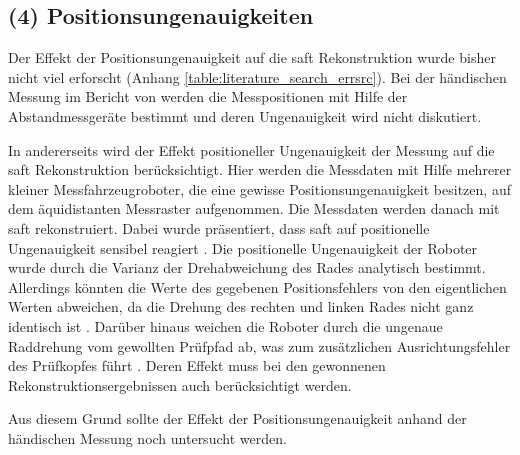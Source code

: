 \subsection*{(4) Positionsungenauigkeiten} 
Der Effekt der Positionsungenauigkeit auf die \acrshort{saft} Rekonstruktion wurde bisher nicht viel erforscht (Anhang \ref{table:literature_search_errsrc}). Bei der händischen Messung im Bericht von \cite{Mayer16SAFTwithSmallData} werden die Messpositionen mit Hilfe der Abstandmessgeräte bestimmt und deren Ungenauigkeit wird nicht diskutiert. \par
In \cite{Dobie10PhD} andererseits wird der Effekt positioneller Ungenauigkeit der Messung auf die \acrshort{saft} Rekonstruktion berücksichtigt. Hier werden die Messdaten mit Hilfe mehrerer kleiner Messfahrzeugroboter, die eine gewisse Positionsungenauigkeit besitzen, auf dem äquidistanten Messraster aufgenommen. Die Messdaten werden danach mit \acrshort{saft} rekonstruiert. Dabei wurde präsentiert, dass \acrshort{saft} auf positionelle Ungenauigkeit sensibel reagiert \cite{Dobie10PhD}. Die positionelle Ungenauigkeit der Roboter wurde durch die Varianz der Drehabweichung des Rades analytisch bestimmt. Allerdings könnten die Werte des gegebenen Positionsfehlers von den eigentlichen Werten abweichen, da die Drehung des rechten und linken Rades nicht ganz identisch ist \cite[S.225]{Dobie10PhD}. Darüber hinaus weichen die Roboter durch die ungenaue Raddrehung vom gewollten Prüfpfad ab, was zum zusätzlichen Ausrichtungsfehler des Prüfkopfes führt \cite[S.226]{Dobie10PhD}. Deren Effekt muss bei den gewonnenen Rekonstruktionsergebnissen \cite[Abb. 7.25, 7.27]{Dobie10PhD} auch berücksichtigt werden. \par
Aus diesem Grund sollte der Effekt der Positionsungenauigkeit anhand der händischen Messung noch untersucht werden.


